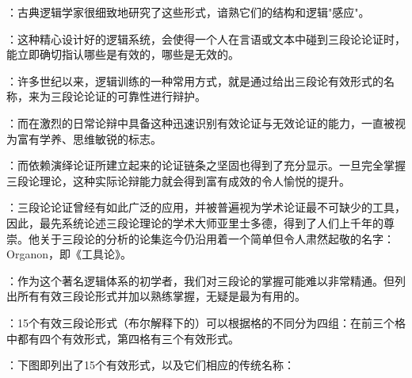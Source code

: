 \begin{logicbox}[title=三段论理论的历史意义与实用价值]
：古典逻辑学家很细致地研究了这些形式，谙熟它们的结构和逻辑"感应"。

：这种精心设计好的逻辑系统，会使得一个人在言语或文本中碰到三段论论证时，能立即确切指认哪些是有效的，哪些是无效的。

：许多世纪以来，逻辑训练的一种常用方式，就是通过给出三段论有效形式的名称，来为三段论论证的可靠性进行辩护。

：而在激烈的日常论辩中具备这种迅速识别有效论证与无效论证的能力，一直被视为富有学养、思维敏锐的标志。

：而依赖演绎论证所建立起来的论证链条之坚固也得到了充分显示。一旦完全掌握三段论理论，这种实际论辩能力就会得到富有成效的令人愉悦的提升。

：三段论论证曾经有如此广泛的应用，并被普遍视为学术论证最不可缺少的工具，因此，最先系统论述三段论理论的学术大师亚里士多德，得到了人们上千年的尊崇。他关于三段论的分析的论集迄今仍沿用着一个简单但令人肃然起敬的名字：Organon，即《工具论》。
\end{logicbox}

：作为这个著名逻辑体系的初学者，我们对三段论的掌握可能难以非常精通。但列出所有有效三段论形式并加以熟练掌握，无疑是最为有用的。

：15个有效三段论形式（布尔解释下的）可以根据格的不同分为四组：在前三个格中都有四个有效形式，第四格有三个有效形式。\cite{patzig1968}

：下图即列出了15个有效形式，以及它们相应的传统名称：

